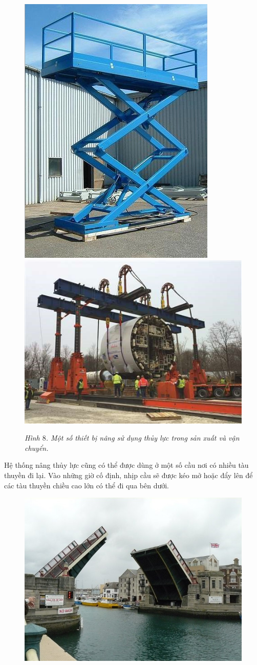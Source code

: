 \begin{multicols}{2}
\begin{figure}[H]
		\includegraphics[height= 0.465\linewidth]{17}
		\includegraphics[height= 0.465\linewidth]{18}
		\caption{\small\textit{\color{timhieukhoahoc}Hình $8$. Một số thiết bị nâng sử dụng thủy lực trong sản xuất và vận chuyển.}}
		\vspace*{-10pt}
	\end{figure}
	Hệ thống nâng thủy lực cũng có thể được dùng ở một số cầu nơi có nhiều tàu thuyền đi lại. Vào những giờ cố định, nhịp cầu sẽ được kéo mở hoặc đẩy lên để các tàu thuyền chiều cao lớn có thể đi qua bên dưới.
	\begin{figure}[H]
		\vspace*{-5pt}
		\centering
		\captionsetup{labelformat= empty, justification=centering}
		\includegraphics[width= 1\linewidth]{19}

\end{figure}
\end{multicols}

